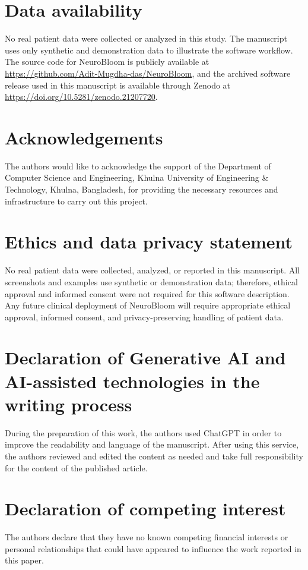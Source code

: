 \documentclass[preprint,12pt,a4paper]{elsarticle}
\begin{document}
\section*{Data availability}

No real patient data were collected or analyzed in this study. The
manuscript uses only synthetic and demonstration data to illustrate the
software workflow. The source code for NeuroBloom is publicly available at
\url{https://github.com/Adit-Mugdha-das/NeuroBloom}, and the archived
software release used in this manuscript is available through Zenodo at
\url{https://doi.org/10.5281/zenodo.21207720}.

\section*{Acknowledgements}
The authors would like to acknowledge the support of the Department of Computer Science and Engineering, Khulna University of Engineering \& Technology, Khulna, Bangladesh, for providing the necessary resources and infrastructure to carry out this project.

\section*{Ethics and data privacy statement}

No real patient data were collected, analyzed, or reported in this manuscript. All screenshots and examples use synthetic or demonstration data; therefore, ethical approval and informed consent were not required for this software description. Any future clinical deployment of NeuroBloom will require appropriate ethical approval, informed consent, and privacy-preserving handling of patient data.

\section*{Declaration of Generative AI and AI-assisted technologies in the writing process}
During the preparation of this work, the authors used ChatGPT in order to improve the readability and language of the manuscript. After using this service, the authors reviewed and edited the content as needed and take full responsibility for the content of the published article.

\section*{Declaration of competing interest}
The authors declare that they have no known competing financial interests or personal relationships that could have appeared to influence the work reported in this paper.
\end{document}
